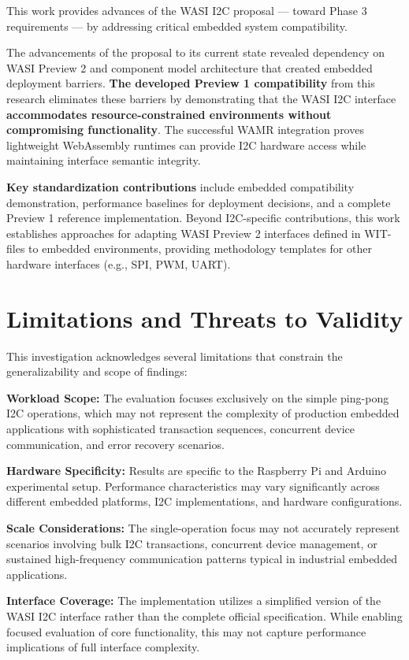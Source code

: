 This work provides advances of the WASI I2C proposal --- toward Phase 3 requirements --- by addressing critical embedded system compatibility.

The advancements of the proposal to its current state revealed dependency on WASI Preview 2 and component model architecture that created embedded deployment barriers. \textbf{The developed Preview 1 compatibility} from this research eliminates these barriers by demonstrating that the WASI I2C interface \textbf{accommodates resource-constrained environments without compromising functionality}. The successful WAMR integration proves lightweight WebAssembly runtimes can provide I2C hardware access while maintaining interface semantic integrity.

\textbf{Key standardization contributions} include embedded compatibility demonstration, performance baselines for deployment decisions, and a complete Preview 1 reference implementation. Beyond I2C-specific contributions, this work establishes approaches for adapting WASI Preview 2 interfaces defined in WIT-files to embedded environments, providing methodology templates for other hardware interfaces (e.g., SPI, PWM, UART).

\section*{Limitations and Threats to Validity}
\label{sec:limitations}

This investigation acknowledges several limitations that constrain the generalizability and scope of findings:

\textbf{Workload Scope:} The evaluation focuses exclusively on the simple ping-pong I2C operations, which may not represent the complexity of production embedded applications with sophisticated transaction sequences, concurrent device communication, and error recovery scenarios.

\textbf{Hardware Specificity:} Results are specific to the Raspberry Pi and Arduino experimental setup. Performance characteristics may vary significantly across different embedded platforms, I2C implementations, and hardware configurations.

\textbf{Scale Considerations:} The single-operation focus may not accurately represent scenarios involving bulk I2C transactions, concurrent device management, or sustained high-frequency communication patterns typical in industrial embedded applications.

\textbf{Interface Coverage:} The implementation utilizes a simplified version of the WASI I2C interface rather than the complete official specification. While enabling focused evaluation of core functionality, this may not capture performance implications of full interface complexity.

